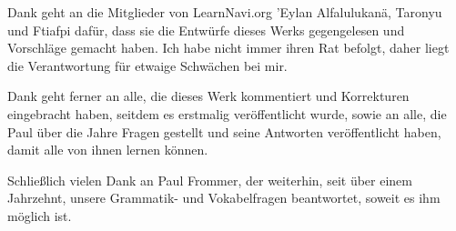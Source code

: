 \vfill
Dank geht an die Mitglieder von LearnNavi.org 'Eylan Alfalulukanä, Taronyu und Ftiafpi dafür, dass sie die Entwürfe dieses Werks gegengelesen und Vorschläge gemacht haben. Ich habe nicht immer ihren Rat befolgt, daher liegt die Verantwortung für etwaige Schwächen bei mir.

Dank geht ferner an alle, die dieses Werk kommentiert und Korrekturen eingebracht haben, seitdem es erstmalig veröffentlicht wurde, sowie an alle, die Paul über die Jahre Fragen gestellt und seine Antworten veröffentlicht haben, damit alle von ihnen lernen können.

Schließlich vielen Dank an Paul Frommer, der weiterhin, seit über einem Jahrzehnt, unsere Grammatik- und Vokabelfragen beantwortet, soweit es ihm möglich ist.

\bigskip